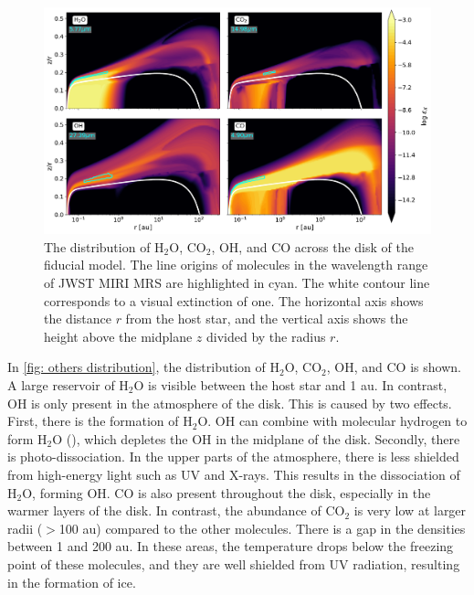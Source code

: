 \documentclass[oneside, single, authoryear, semicolon, 12pt]{lion-msc}
\newcommand{\4}{$_4$}
\newcommand{\3}{$_3$}
\newcommand{\2}{$_2$}
\begin{document}
\begin{figure}[H]
    \centering
    \includegraphics[width=\linewidth]{Figures/Abundance1.pdf}
    \caption{The distribution of H\2O, CO\2, OH, and CO across the disk of the fiducial model. The line origins of molecules in the wavelength range of JWST MIRI MRS are highlighted in cyan. The white contour line corresponds to a visual extinction of one. The horizontal axis shows the distance $r$ from the host star, and the vertical axis shows the height above the midplane $z$ divided by the radius $r$.}
    \label{fig: others distribution}
\end{figure}

In \autoref{fig: others distribution}, the distribution of H\2O, CO\2, OH, and CO is shown. A large reservoir of H\2O is visible between the host star and 1 au. In contrast, OH is only present in the atmosphere of the disk. This is caused by two effects. First, there is the formation of H\2O. OH can combine with molecular hydrogen to form H\2O (), which depletes the OH in the midplane of the disk. Secondly, there is photo-dissociation. In the upper parts of the atmosphere, there is less shielded from high-energy light such as UV and X-rays. This results in the dissociation of H\2O, forming OH. CO is also present throughout the disk, especially in the warmer layers of the disk. In contrast, the abundance of CO\2 is very low at larger radii ($>$100 au) 
compared to the other molecules. There is a gap in the densities between 1 and 200 au. In these areas, the temperature drops below the freezing point of these molecules, and they are well shielded from UV radiation, resulting in the formation of ice. 
\end{document}
